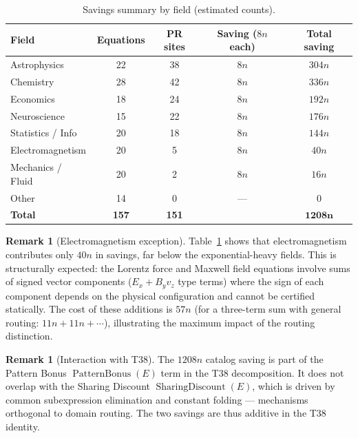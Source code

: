 \documentclass[12pt,a4paper]{article}
\theoremstyle{definition}
\newtheorem{remark}[theorem]{Remark}
\newcommand{\SD}{\operatorname{SharingDiscount}}
\newcommand{\PB}{\operatorname{PatternBonus}}
\begin{document}
\begin{table}[h]
\centering
\caption{Savings summary by field (estimated counts).}
\label{tab:savings}
\smallskip
\begin{tabular}{@{}lcccc@{}}
\toprule
\textbf{Field} & \textbf{Equations} &
  \textbf{PR sites} & \textbf{Saving ($8n$ each)} &
  \textbf{Total saving} \\
\midrule
Astrophysics       & 22 & 38 & $8n$ & $304n$ \\
Chemistry          & 28 & 42 & $8n$ & $336n$ \\
Economics          & 18 & 24 & $8n$ & $192n$ \\
Neuroscience       & 15 & 22 & $8n$ & $176n$ \\
Statistics / Info  & 20 & 18 & $8n$ & $144n$ \\
Electromagnetism   & 20 &  5 & $8n$ &  $40n$ \\
Mechanics / Fluid  & 20 &  2 & $8n$ &  $16n$ \\
Other              & 14 &  0 &  ---  &      0 \\
\midrule
\textbf{Total}     & \textbf{157} & \textbf{151} & & $\mathbf{1208n}$ \\
\bottomrule
\end{tabular}
\end{table}

\begin{remark}[Electromagnetism exception]
Table~\ref{tab:savings} shows that electromagnetism contributes only $40n$ in
savings, far below the exponential-heavy fields.  This is structurally expected:
the Lorentz force and Maxwell field equations involve sums of signed vector
components ($E_x + B_y v_z$ type terms) where the sign of each component
depends on the physical configuration and cannot be certified statically.  The
cost of these additions is $57n$ (for a three-term sum with general routing:
$11n + 11n + \cdots$), illustrating the maximum impact of the routing
distinction.
\end{remark}

\begin{remark}[Interaction with T38]
The $1208n$ catalog saving is part of the Pattern Bonus $\PB(E)$ term in the
T38 decomposition.  It does not overlap with the Sharing Discount $\SD(E)$,
which is driven by common subexpression elimination and constant folding ---
mechanisms orthogonal to domain routing.  The two savings are thus additive in
the T38 identity.
\end{remark}
\end{document}
